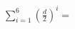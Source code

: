 \documentclass[preview]{standalone}
\begin{document}
\begin{align*}
\sum_{i=1}^6 \left(\frac{d}{2}\right)^i=
\end{align*}
\end{document}
